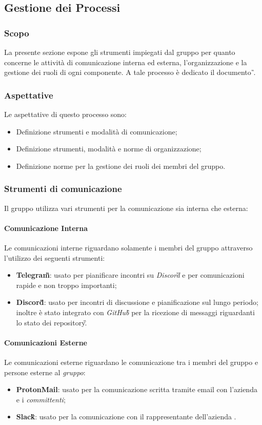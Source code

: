 \subsection{Gestione dei Processi} %
\subsubsection{Scopo}
La presente sezione espone gli strumenti impiegati dal gruppo \teamname{} per quanto concerne le attività di comunicazione interna ed esterna, l'organizzazione e la gestione dei ruoli di ogni componente.
A tale processo è dedicato il documento \PdP{}\textit{\G}.

\subsubsection{Aspettative}
Le aspettative di questo processo sono:
\begin{itemize}
	\item Definizione strumenti e modalità di comunicazione;
	\item Definizione strumenti, modalità e norme di organizzazione;
	\item Definizione norme per la gestione dei ruoli dei membri del gruppo.
\end{itemize}

\subsubsection{Strumenti di comunicazione}
Il gruppo \teamname{} utilizza vari strumenti per la comunicazione sia interna che esterna:
	\paragraph{Comunicazione Interna}
		Le comunicazioni interne riguardano solamente i membri del gruppo \teamname{} attraverso l'utilizzo dei seguenti strumenti:
			\begin{itemize}
				\item \textbf{Telegram\G}: usato per pianificare incontri su \emph{Discord}\G{} e per comunicazioni rapide e non troppo importanti;
				\item \textbf{Discord\G}: usato per incontri di discussione e pianificazione sul lungo periodo; inoltre è stato integrato con \emph{GitHub\G{}} per la ricezione di messaggi riguardanti lo stato dei repository\G.
			\end{itemize}
	\paragraph{Comunicazioni Esterne}
	\label{sec:Comunicazioni Esterne}
		Le comunicazioni esterne riguardano le comunicazione tra i membri del gruppo \teamname e persone esterne al \emph{gruppo}:
			\begin{itemize}
				\item \textbf{ProtonMail}: usato per la comunicazione scritta tramite email con l'azienda \proponente e i \emph{committenti};
				\item \textbf{Slack\G}: usato per la comunicazione con il rappresentante dell'azienda \proponente.
			\end{itemize}
		
